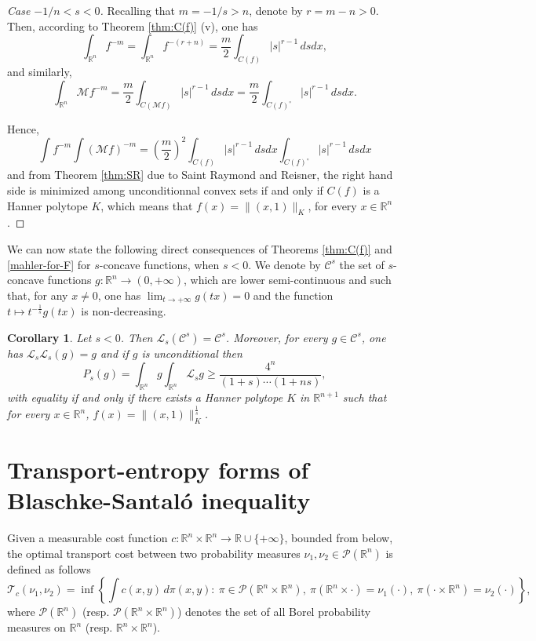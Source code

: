 \documentclass[10pt]{amsart}
\newtheorem{cor}[thm]{Corollary}
\theoremstyle{definition}
\theoremstyle{remark}
\newcommand{\R}{\mathbb{R}}
\renewcommand{\L}{\mathcal{L}}
\newcommand{\M}{\mathcal{M}}
\begin{document}
\begin{proof}[Case $-1/n<s< 0$]
Recalling that $m=-1/s>n$, denote by $r=m-n>0$. Then, according to Theorem \ref{thm:C(f)} (v), one has 
$$\int_{\R^n} f^{-m}=\int_{\R^n} f^{-(r+n)}=\frac{m}{2}\int_{C(f)} |s|^{r-1}\,dsdx,$$
and similarly,
$$\int_{\R^n} \M f^{-m} = \frac{m}{2}\int_{C(\M f)} |s|^{r-1}\,dsdx = \frac{m}{2}\int_{C(f)^\circ} |s|^{r-1}\,dsdx.$$

Hence,
\[\int f^{-m} \int (\M f)^{-m} = \left(\frac{m}{2}\right)^2 \int_{C(f)} |s|^{r-1}\,dsdx\int_{C(f)^\circ} |s|^{r-1}\,dsdx \]
and from Theorem \ref{thm:SR} due to Saint Raymond and Reisner, the right hand side is minimized among unconditionnal convex sets if and only if $C(f)$  is a Hanner polytope $K$, which means that $f(x)=\|(x,1)\|_K$, for every $x\in\R^n$. 
\end{proof}

We can now state the following direct consequences of Theorems \ref{thm:C(f)} and \ref{mahler-for-F} for $s$-concave functions, when $s<0$. We denote by $\mathcal{C}^s$ the set of $s$-concave functions $g:\R^n\to (0,+\infty)$, which are lower semi-continuous and such that, for any $x\neq0$, one has $\lim_{t\to+\infty}g(tx)=0$ and the function $t\mapsto t^{-\frac{1}{s}}g(tx)$ is non-decreasing. 

\begin{cor} Let $s<0$. Then $\L_s(\mathcal{C}^s)=\mathcal{C}^s$. Moreover, for every $g\in\mathcal{C}^s$, one has $\L_s\L_s(g)=g$ and if $g$ is unconditional then
\[
P_s(g)=\int_{\R^n} g\int_{\R^n}\L_s g\ge\frac{4^n}{(1+s)\cdots(1+ns)},
\]
with equality if and only if there exists a Hanner polytope $K$ in $\R^{n+1}$ such that for every $x\in\R^n$, $f(x)=\|(x,1)\|_K^\frac{1}{s}$.
\end{cor}





\color{black}
\section{Transport-entropy forms of Blaschke-Santal\'o inequality}\label{sec:TE}
Given a measurable cost function $c:\R^n\times \R^n\to \R\cup\{+\infty\}$, bounded from below, the optimal transport cost between two probability measures $\nu_1,\nu_2 \in \mathcal{P}(\R^n)$ is defined as follows
\[
\mathcal{T}_c(\nu_1,\nu_2) =\inf\left\{ \int c(x,y) \,d\pi(x,y):\ \pi\in \mathcal{P}(\R^n\times\R^n),\ \pi(\R^n\times \cdot)=\nu_1(\cdot),\ \pi(\cdot\times\R^n)=\nu_2(\cdot) \right\},
\]
where $\mathcal{P}(\R^n)$ (resp. $\mathcal{P}(\R^n\times \R^n)$) denotes the set of all Borel probability measures on $\R^n$ (resp. $\R^n\times \R^n$).
\end{document}
